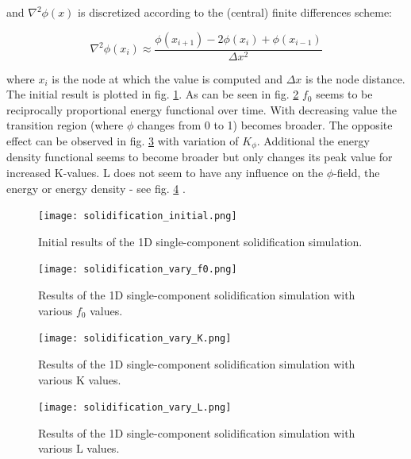and \(\nabla^{2} \phi(x) \) is discretized according to the (central) finite differences scheme:

\begin{equation}
	\nabla^{2} \phi(x_{i}) \approx \frac{\phi(x_{i+1}) - 2\phi(x_{i}) + \phi(x_{i-1}) }{\Delta x^{2}} \label{eq:central_euler_second_derivative}
\end{equation}

where \(x_{i}\) is the node at which the value is computed and \(\Delta x\) is the node distance. The initial result is plotted in fig. \ref{fig:solidification_init}. As can be seen in fig. \ref{fig:solidification_f0} \(f_{0}\) seems to be reciprocally proportional energy functional over time. With decreasing value the transition region (where \(\phi\) changes from 0 to 1) becomes broader. The opposite effect can be observed in fig. \ref{fig:solidification_K} with variation of \(K_{\phi}\). Additional the energy density functional seems to become broader but only changes its peak value for increased K-values. L does not seem to have any influence on the \(\phi\)-field, the energy or energy density - see fig. \ref{fig:solidification_L} .


\begin{figure}[htb]
	\centering
	\texttt{[image: solidification\_initial.png]}
	\caption{Initial results of the 1D single-component solidification simulation.}
	\label{fig:solidification_init}
\end{figure}

\begin{figure}[htb]
	\centering
	\texttt{[image: solidification\_vary\_f0.png]}
	\caption{Results of the 1D single-component solidification simulation with various \(f_{0}\) values.}
	\label{fig:solidification_f0}
\end{figure}

\begin{figure}[htb]
	\centering
	\texttt{[image: solidification\_vary\_K.png]}
	\caption{Results of the 1D single-component solidification simulation with various K values.}
	\label{fig:solidification_K}
\end{figure}


\begin{figure}[htb]
	\centering
	\texttt{[image: solidification\_vary\_L.png]}
	\caption{Results of the 1D single-component solidification simulation with various L values.}
	\label{fig:solidification_L}
\end{figure}

